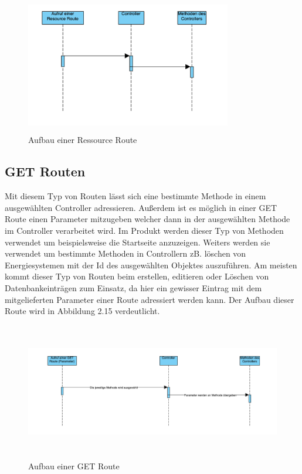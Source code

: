 \begin{figure}[h]
	\centering
	\includegraphics[height=6cm,width=9cm]{images/ResourceRoute}
	\caption{Aufbau einer Ressource Route}
	\label{fig:ResourceRoute}
\end{figure}

\subsection{GET Routen}
Mit diesem Typ von Routen lässt sich eine bestimmte Methode in einem ausgewählten Controller adressieren. Außerdem ist es möglich in einer GET Route einen Parameter mitzugeben welcher dann in der ausgewählten Methode im Controller verarbeitet wird. Im Produkt werden dieser Typ von Methoden verwendet um beispielsweise die Startseite anzuzeigen. Weiters werden sie verwendet um bestimmte Methoden in Controllern zB. löschen von Energiesystemen mit der Id des ausgewählten Objektes auszuführen. Am meisten kommt dieser Typ von Routen beim erstellen, editieren oder Löschen von Datenbankeinträgen zum Einsatz, da hier ein gewisser Eintrag mit dem mitgelieferten Parameter einer Route adressiert werden kann. Der Aufbau dieser Route wird in Abbildung 2.15 verdeutlicht.


\begin{figure}[h]
	\centering
	\includegraphics[height=6cm,width=16cm]{images/GETRoute}
	\caption{Aufbau einer GET Route}
	\label{fig:GETRoute}
\end{figure}

